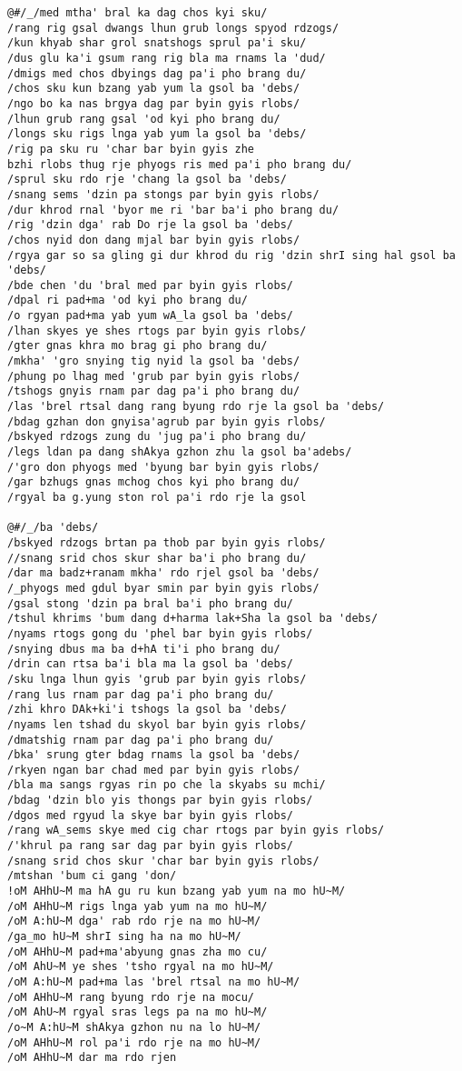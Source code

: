 \documentclass{article}
\begin{document}
\begin{verbatim}
@#/_/med mtha' bral ka dag chos kyi sku/
/rang rig gsal dwangs lhun grub longs spyod rdzogs/
/kun khyab shar grol snatshogs sprul pa'i sku/
/dus glu ka'i gsum rang rig bla ma rnams la 'dud/
/dmigs med chos dbyings dag pa'i pho brang du/
/chos sku kun bzang yab yum la gsol ba 'debs/
/ngo bo ka nas brgya dag par byin gyis rlobs/
/lhun grub rang gsal 'od kyi pho brang du/
/longs sku rigs lnga yab yum la gsol ba 'debs/
/rig pa sku ru 'char bar byin gyis zhe
bzhi rlobs thug rje phyogs ris med pa'i pho brang du/
/sprul sku rdo rje 'chang la gsol ba 'debs/
/snang sems 'dzin pa stongs par byin gyis rlobs/
/dur khrod rnal 'byor me ri 'bar ba'i pho brang du/
/rig 'dzin dga' rab Do rje la gsol ba 'debs/
/chos nyid don dang mjal bar byin gyis rlobs/
/rgya gar so sa gling gi dur khrod du rig 'dzin shrI sing hal gsol ba 'debs/
/bde chen 'du 'bral med par byin gyis rlobs/
/dpal ri pad+ma 'od kyi pho brang du/
/o rgyan pad+ma yab yum wA_la gsol ba 'debs/
/lhan skyes ye shes rtogs par byin gyis rlobs/
/gter gnas khra mo brag gi pho brang du/
/mkha' 'gro snying tig nyid la gsol ba 'debs/
/phung po lhag med 'grub par byin gyis rlobs/
/tshogs gnyis rnam par dag pa'i pho brang du/
/las 'brel rtsal dang rang byung rdo rje la gsol ba 'debs/
/bdag gzhan don gnyisa'agrub par byin gyis rlobs/
/bskyed rdzogs zung du 'jug pa'i pho brang du/
/legs ldan pa dang shAkya gzhon zhu la gsol ba'adebs/
/'gro don phyogs med 'byung bar byin gyis rlobs/
/gar bzhugs gnas mchog chos kyi pho brang du/
/rgyal ba g.yung ston rol pa'i rdo rje la gsol

@#/_/ba 'debs/
/bskyed rdzogs brtan pa thob par byin gyis rlobs/
//snang srid chos skur shar ba'i pho brang du/
/dar ma badz+ranam mkha' rdo rjel gsol ba 'debs/
/_phyogs med gdul byar smin par byin gyis rlobs/
/gsal stong 'dzin pa bral ba'i pho brang du/
/tshul khrims 'bum dang d+harma lak+Sha la gsol ba 'debs/
/nyams rtogs gong du 'phel bar byin gyis rlobs/
/snying dbus ma ba d+hA ti'i pho brang du/
/drin can rtsa ba'i bla ma la gsol ba 'debs/
/sku lnga lhun gyis 'grub par byin gyis rlobs/
/rang lus rnam par dag pa'i pho brang du/
/zhi khro DAk+ki'i tshogs la gsol ba 'debs/
/nyams len tshad du skyol bar byin gyis rlobs/
/dmatshig rnam par dag pa'i pho brang du/
/bka' srung gter bdag rnams la gsol ba 'debs/
/rkyen ngan bar chad med par byin gyis rlobs/
/bla ma sangs rgyas rin po che la skyabs su mchi/
/bdag 'dzin blo yis thongs par byin gyis rlobs/
/dgos med rgyud la skye bar byin gyis rlobs/
/rang wA_sems skye med cig char rtogs par byin gyis rlobs/
/'khrul pa rang sar dag par byin gyis rlobs/
/snang srid chos skur 'char bar byin gyis rlobs/
/mtshan 'bum ci gang 'don/
!oM AHhU~M ma hA gu ru kun bzang yab yum na mo hU~M/
/oM AHhU~M rigs lnga yab yum na mo hU~M/
/oM A:hU~M dga' rab rdo rje na mo hU~M/
/ga_mo hU~M shrI sing ha na mo hU~M/
/oM AHhU~M pad+ma'abyung gnas zha mo cu/
/oM AhU~M ye shes 'tsho rgyal na mo hU~M/
/oM A:hU~M pad+ma las 'brel rtsal na mo hU~M/
/oM AHhU~M rang byung rdo rje na mocu/
/oM AhU~M rgyal sras legs pa na mo hU~M/
/o~M A:hU~M shAkya gzhon nu na lo hU~M/
/oM AHhU~M rol pa'i rdo rje na mo hU~M/
/oM AHhU~M dar ma rdo rjen


\end{verbatim}
\end{document}
